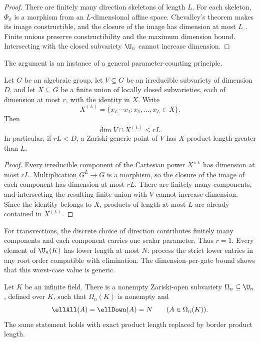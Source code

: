 \begin{proof}
There are finitely many direction skeletons of length $L$.  For each skeleton, $\Phi_\sigma$ is a morphism from an $L$-dimensional affine space.  Chevalley's theorem makes its image constructible, and the closure of the image has dimension at most $L$ \cite{Hartshorne1977}.  Finite unions preserve constructibility and the maximum dimension bound.  Intersecting with the closed subvariety $\U_n$ cannot increase dimension.
\end{proof}

The argument is an instance of a general parameter-counting principle.

\begin{proposition}\label{prop:dimension-per-gate}
Let $G$ be an algebraic group, let $V\subseteq G$ be an irreducible subvariety of dimension $D$, and let $X\subseteq G$ be a finite union of locally closed subvarieties, each of dimension at most $r$, with the identity in $X$.  Write
\[
X^{(L)}
=
\{x_L\cdots x_1:x_1,\ldots,x_L\in X\}.
\]
Then
\[
\dim\overline{V\cap X^{(L)}}\le rL.
\]
In particular, if $rL<D$, a Zariski-generic point of $V$ has $X$-product length greater than $L$.
\end{proposition}

\begin{proof}
Every irreducible component of the Cartesian power $X^{\times L}$ has dimension at most $rL$.  Multiplication $G^L\to G$ is a morphism, so the closure of the image of each component has dimension at most $rL$.  There are finitely many components, and intersecting the resulting finite union with $V$ cannot increase dimension.  Since the identity belongs to $X$, products of length at most $L$ are already contained in $X^{(L)}$.
\end{proof}

For transvections, the discrete choice of direction contributes finitely many components and each component carries one scalar parameter.  Thus $r=1$.  Every element of $\U_n(K)$ has lower length at most $N$: process the strict lower entries in any root order compatible with elimination.  The dimension-per-gate bound shows that this worst-case value is generic.

\begin{theorem}\label{thm:generic-rigidity}
Let $K$ be an infinite field.  There is a nonempty Zariski-open subvariety $\Omega_n\subseteq\U_n$, defined over $K$, such that $\Omega_n(K)$ is nonempty and
\[
\ellAll(A)=\ellDown(A)=N
\qquad(A\in\Omega_n(K)).
\]
The same statement holds with exact product length replaced by border product length.
\end{theorem}

